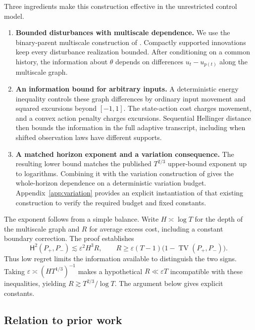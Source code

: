 \documentclass[11pt]{article}
\theoremstyle{remark}
\newcommand{\TV}{\operatorname{TV}}
\newcommand{\HH}{\mathsf H}
\begin{document}
Three ingredients make this construction effective in the unrestricted
control model.
\begin{enumerate}[leftmargin=*,itemsep=4pt]
\item \textbf{Bounded disturbances with multiscale dependence.}
We use the binary-parent multiscale construction of \citet{dekel}.
Compactly supported innovations keep every disturbance realization bounded.
After conditioning on a common history, the information about $\theta$
depends on differences $u_t-u_{p(t)}$ along the multiscale graph.
\item \textbf{An information bound for arbitrary inputs.}
A deterministic energy inequality controls these graph differences by
ordinary input movement and squared excursions beyond $[-1,1]$.
The state-action cost charges movement, and a convex action penalty charges
excursions. Sequential Hellinger distance
then bounds the information in the full adaptive transcript, including when
shifted observation laws have different supports.
\item \textbf{A matched horizon exponent and a variation consequence.}
The resulting lower bound matches the published $T^{2/3}$ upper-bound
exponent up to logarithms. Combining it with the variation construction of
\citet{minasyan} gives the whole-horizon dependence on a deterministic
variation budget. Appendix~\ref{app:variation} provides an explicit
instantiation of that existing construction to verify the required budget
and fixed constants.
\end{enumerate}

The exponent follows from a simple balance. Write $H\asymp\log T$ for the
depth of the multiscale graph and $R$ for average excess cost, including a
constant boundary correction. The proof establishes
\[
 \HH^2(P_+,P_-)\lesssim\varepsilon^2H^3R,
 \qquad
 R\ge\varepsilon(T-1)\bigl(1-\TV(P_+,P_-)\bigr).
\]
Thus low regret limits the information available to distinguish the two
signs. Taking $\varepsilon\asymp(H T^{1/3})^{-1}$ makes a hypothetical
$R\ll\varepsilon T$ incompatible with these inequalities, yielding
$R\gtrsim T^{2/3}/\log T$. The argument below gives explicit constants.

\subsection{Relation to prior work}\label{sec:related}
\end{document}
